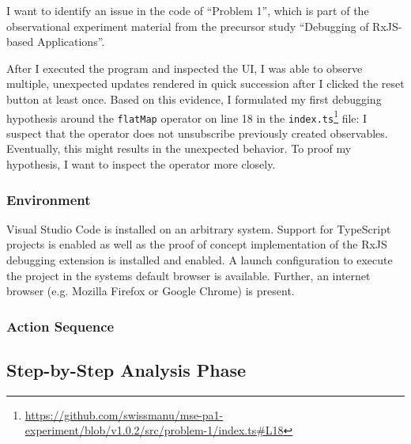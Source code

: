 \documentclass[sigplan,screen,nonacm,review]{acmart}
\begin{document}
I want to identify an issue in the code of ``Problem 1'', which is part of the observational experiment material from the precursor study ``Debugging of RxJS-based Applications''\cite{TODO}.

After I executed the program and inspected the UI, I was able to observe multiple, unexpected updates rendered in quick succession after I clicked the reset button at least once. Based on this evidence, I formulated my first debugging hypothesis around the \texttt{flatMap} operator on line 18 in the \texttt{index.ts}\footnote{\url{https://github.com/swissmanu/mse-pa1-experiment/blob/v1.0.2/src/problem-1/index.ts\#L18}} file: I suspect that the operator does not unsubscribe previously created observables. Eventually, this might results in the unexpected behavior. To proof my hypothesis, I want to inspect the operator more closely.

\subsubsection{Environment}

Visual Studio Code is installed on an arbitrary system. Support for TypeScript projects is enabled as well as the proof of concept implementation of the RxJS debugging extension is installed and enabled. A launch configuration to execute the project in the systems default browser is available. Further, an internet browser (e.g. Mozilla Firefox or Google Chrome) is present.

\subsubsection{Action Sequence}

\subsection{Step-by-Step Analysis Phase}

\end{document}

